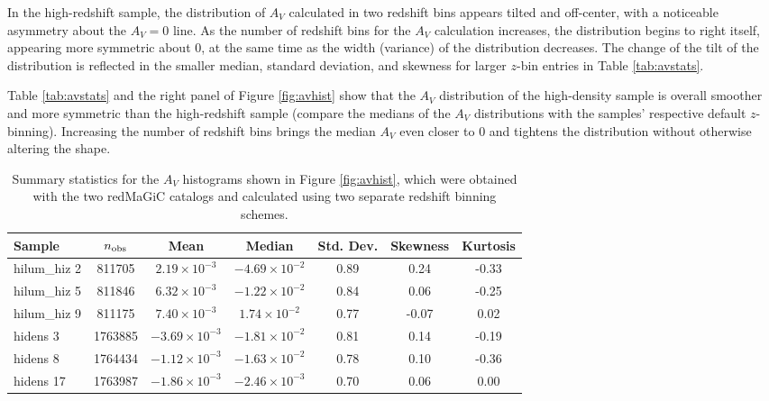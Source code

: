 \documentclass[11pt, oneside]{article}   	%
\begin{document}
In the high-redshift sample, the distribution of $A_V$ calculated in two redshift bins appears tilted and off-center, with a noticeable asymmetry about the $A_V = 0$ line. As the number of redshift bins for the $A_V$ calculation increases, the distribution begins to right itself, appearing more symmetric about 0, at the same time as the width (variance) of the distribution decreases. The change of the tilt of the distribution is reflected in the smaller median, standard deviation, and skewness for larger $z$-bin entries in Table \ref{tab:avstats}. 

Table \ref{tab:avstats} and the right panel of Figure \ref{fig:avhist} show that the $A_V$ distribution of the high-density sample is overall smoother and more symmetric than the high-redshift sample (compare the medians of the $A_V$ distributions with the samples' respective default $z$-binning). Increasing the number of redshift bins brings the median $A_V$ even closer to 0 and tightens the distribution without otherwise altering the shape. 

\begin{table}\label{tab:avstats}
    \centering
    \begin{tabular}{|l|c|c|c|c|c|c|}
    \hline
    Sample & $n_{\rm obs}$ & Mean & Median & Std. Dev. & Skewness & Kurtosis \\
    \hline
    hilum\_hiz 2  & 811705 & $2.19 \times 10^{-3}$ & $-4.69 \times 10^{-2}$ & 0.89 & 0.24  & -0.33    \\ 
    \hline
    hilum\_hiz 5  & 811846 & $6.32 \times 10^{-3}$ & $-1.22 \times 10^{-2}$ & 0.84  & 0.06 & -0.25    \\ 
    \hline
    hilum\_hiz 9  & 811175 & $7.40 \times 10^{-3}$ & $1.74 \times 10^{-2}$  & 0.77 & -0.07 & 0.02     \\ 
    \hline
    hidens 3  & 1763885 & $-3.69 \times 10^{-3}$ & $-1.81 \times 10^{-2}$ & 0.81 & 0.14 & -0.19    \\ 
    \hline
    hidens 8  & 1764434 & $-1.12 \times 10^{-3}$ & $-1.63 \times 10^{-2}$ & 0.78 & 0.10  & -0.36    \\ 
    \hline
    hidens 17  & 1763987 & $-1.86 \times 10^{-3}$ & $-2.46 \times 10^{-3}$ & 0.70 & 0.06 & 0.00     \\ 
    \hline
    \end{tabular}
    \caption{Summary statistics for the $A_V$ histograms shown in Figure \ref{fig:avhist}, which were obtained with the two redMaGiC catalogs and calculated using two separate redshift binning schemes.}
    \label{tab:stats}
\end{table}
\end{document}
